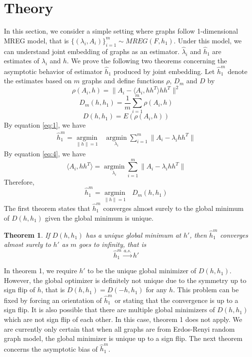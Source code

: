 \documentclass[10pt,journal,compsoc]{IEEEtran}
\newtheorem{theorem}{Theorem}[section]
\begin{document}
\section{Theory}
In this section, we consider a simple setting where graphs follow 1-dimensional MREG model, that is $\{(\lambda_i,A_i)\} _{i=1}^m \sim MREG(F,h_1)$. Under this model, we can understand joint embedding of graphs as an estimator. $\hat{\lambda}_i$ and $\hat{h}_1$ are estimates of $\lambda_i$ and $h$. We prove the following two theorems concerning the asymptotic behavior of estimator $\hat{h}_1$ produced by joint embedding. Let $\hat{h}_1^m$ denote the estimates based on $m$ graphs and define functions $\rho$, $D_m$ and $D$ by
\[ \rho(A_i,h)= \|A_i- \langle A_i,h h^T \rangle h h^T\|^2 \]
\[ D_m(h,h_1) =\frac{1}{m}\sum_{i=1}^{m} \rho(A_i,h) \]
\[ D(h,h_1) = E(\rho(A_i,h)) \]
By equation \eqref{eq:1}, we have
\begin{align*} 
\hat{h}_1^m = \underset{\|h\| =1}{\operatorname{argmin}} \text{ }   \underset{\lambda_i}{\operatorname{argmin}} \sum_{i=1}^{m} \|A_i - \lambda_i h h^T\|
\end{align*}
By equation \eqref{eq:4}, we have 
\[\langle A_i,hh^T \rangle=\underset{\lambda_i}{\operatorname{argmin}} \sum_{i=1}^{m} \|A_i - \lambda_i h h^T\|\]
Therefore,
\[\hat{h}_1^m = \underset{\|h\| =1}{\operatorname{argmin}} \text{ } D_m(h,h_1) \]
The first theorem states that $\hat{h}_1^m$  converges almost surely to the global minimum of $D(h,h_1)$ given the global minimum is unique.
\begin{theorem}
	If $D(h,h_1)$ has a unique global minimum at $h'$, then $\hat{h}_1^m$ converges almost surely to $h'$ as $m$ goes to infinity, that is 
	\[ \hat{h}_1^m \overset{a.s.}{\rightarrow} h' \]
\end{theorem}

\noindent In theorem 1, we require $h'$ to be the unique global minimizer of $D(h,h_1)$. However, the global optimizer is definitely not unique due to the symmetry up to sign flip of $h$, that is $D(h,h_1)=D(-h,h_1)$ for any $h$. This problem can be fixed by forcing an orientation of $\hat{h}_1^m$ or stating that the convergence is up to a sign flip. It is also possible that there are multiple global minimizers of $D(h,h_1)$ which are not sign flip of each other. In this case, theorem 1 does not apply. We are currently only certain that when all graphs are from Erdos-Renyi random graph model, the global minimizer is unique up to a sign flip. The next theorem concerns the asymptotic bias of $\hat{h}_1^m$. 
\end{document}

